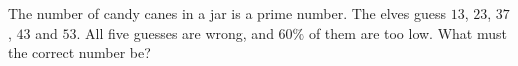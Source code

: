 The number of candy canes in a jar is a prime number. The elves guess $13$, $23$, $37$, $43$ and $53$. All five guesses are wrong, and $60\%$ of them are too low. What must the correct number be?

